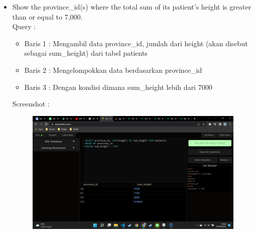 \documentclass[]{article}
\begin{document}
\begin{itemize}
        \item Show the province\_id(s) where the total sum of its patient's height is greater than or equal to 7,000.
        \\Query :
        
        \begin{itemize}
            \item Baris 1 : Mengambil data province\_id, jumlah dari height (akan disebut sebagai sum\_height) dari tabel patients
            \item Baris 2 : Mengelompokkan data berdasarkan province\_id
            \item Baris 3 : Dengan kondisi dimana sum\_height lebih dari 7000
        \end{itemize}
        \pagebreak
        Screenshot :
        \begin{figure}[h]
            \includegraphics[scale=0.3]{./Screenshot/Medium-15.png}
            \centering
        \end{figure}


\end{itemize}
\end{document}
